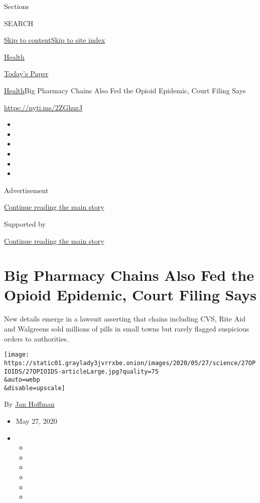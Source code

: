 Sections

SEARCH

\protect\hyperlink{site-content}{Skip to
content}\protect\hyperlink{site-index}{Skip to site index}

\href{https://www.nytimes3xbfgragh.onion/section/health}{Health}

\href{https://myaccount.nytimes3xbfgragh.onion/auth/login?response_type=cookie\&client_id=vi}{}

\href{https://www.nytimes3xbfgragh.onion/section/todayspaper}{Today's
Paper}

\href{/section/health}{Health}\textbar{}Big Pharmacy Chains Also Fed the
Opioid Epidemic, Court Filing Says

\url{https://nyti.ms/2ZGhurJ}

\begin{itemize}
\item
\item
\item
\item
\item
\item
\end{itemize}

Advertisement

\protect\hyperlink{after-top}{Continue reading the main story}

Supported by

\protect\hyperlink{after-sponsor}{Continue reading the main story}

\hypertarget{big-pharmacy-chains-also-fed-the-opioid-epidemic-court-filing-says}{%
\section{Big Pharmacy Chains Also Fed the Opioid Epidemic, Court Filing
Says}\label{big-pharmacy-chains-also-fed-the-opioid-epidemic-court-filing-says}}

New details emerge in a lawsuit asserting that chains including CVS,
Rite Aid and Walgreens sold millions of pills in small towns but rarely
flagged suspicious orders to authorities.

\texttt{[image: https://static01.graylady3jvrrxbe.onion/images/2020/05/27/science/27OPIOIDS/27OPIOIDS-articleLarge.jpg?quality=75\\\&auto=webp\\\&disable=upscale]}

By \href{https://www.nytimes3xbfgragh.onion/by/jan-hoffman}{Jan Hoffman}

\begin{itemize}
\item
  May 27, 2020
\item
  \begin{itemize}
  \item
  \item
  \item
  \item
  \item
  \item
  \end{itemize}
\end{itemize}

